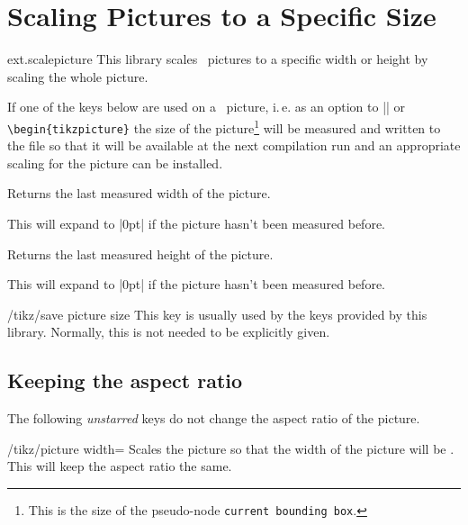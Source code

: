%
%
%
\clearpage
\section{Scaling Pictures to a Specific Size}
\label{library:scalepicture}

\begin{tikzlibrary}{ext.scalepicture}
  This library scales \tikzname\ pictures to a specific width or height
  by scaling the whole picture.
\end{tikzlibrary}

\begin{multicols}{2}
If one of the keys below are used on a \tikzname\ picture, i.\,e.
as an option to |\tikzpicture| or \texttt{\textbackslash begin\{tikzpicture\}}
the size of the picture\footnote{This is the size of the pseudo-node \texttt{current bounding box}.}
will be measured and written to the  file
so that it will be available at the next compilation run
and an appropriate scaling for the picture can be installed.

\begin{command}{\tikzextpicturewidth}
  Returns the last measured width of the picture.
  
  This will expand to |0pt| if the picture hasn't been measured before.
\end{command}
\begin{command}{\tikzextpictureheight}
  Returns the last measured height of the picture.
  
  This will expand to |0pt| if the picture hasn't been measured before.
\end{command}

\begin{stylekey}{/tikz/save picture size}
  This key is usually used by the keys provided by this library.
  Normally, this is not needed to be explicitly given.
\end{stylekey}
\subsection{Keeping the aspect ratio}
The following \emph{unstarred} keys do not change the aspect ratio of the picture.

\begin{key}{/tikz/picture width=}
  Scales the picture so that the width of the picture will be .
  This will keep the aspect ratio the same.
\end{key}


\end{multicols}
